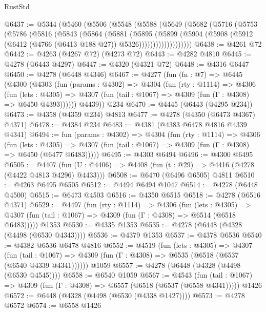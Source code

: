 \begin{lexlean}{RustStd}
\begin{coremodule}
@6437 := @5344
    (@5460
      (@5506
        (@5548
          (@5588
            (@5649
              (@5682
                (@5716
                  (@5753
                    (@5786
                      (@5816
                        (@5843
                          (@5864
                            (@5881
                              (@5895
                                (@5899
                                  (@5904
                                    (@5908
                                      (@5912
                                        (@6412 (@4766 (@6413 @188 @27)) @5326)))))))))))))))))))
@6438 := @4261 @72
@6442 := @4263 (@4267 @72) (@4273 @72)
@6443 := @4282 @4810
@6445 := @4278 (@6443 @4297)
@6447 := @4320 (@4321 @72)
@6448 := @4316 @6447
@6450 := @4278 (@6448 @4346)
@6467 := @4277
    (fun (fn : @7) =>
    @6445
      (@4300
        (@4303
          (fun (params : @4302) =>
          @4304
            (fun (rty : @1114) =>
            @4306
              (fun (lets : @4305) =>
              @4307 (fun (tail : @1067) => @4309 (fun (Γ : @4308) => @6450 @4393))))))
        @4439))
    @234
@6470 := @4445 (@6443 (@4295 @234))
@6473 := @4358 (@4359 @234) @4813
@6477 := @4278 (@4350 (@6473 @4367) @4371)
@6478 := @4384 @234
@6483 := @4381 (@4383 @6478 @4816 @4339 @4341)
@6494 := fun (params : @4302) =>
  @4304
    (fun (rty : @1114) =>
    @4306
      (fun (lets : @4305) =>
      @4307 (fun (tail : @1067) => @4309 (fun (Γ : @4308) => @6450 (@6477 @6483)))))
@6495 := @4303 @6494
@6496 := @4300 @6495
@6505 := @4407 (fun (U : @4406) => @4408 (fun (t : @29) => @4416 (@4278 (@4422 @4813 @4296) @4433)))
@6508 := @6470 (@6496 @6505) @4811
@6510 := @4263 @6495 @6505
@6512 := @4494 @6494 @1047
@6514 := @4278 (@6448 @4500)
@6515 := @6473 @4503
@6516 := @4350 @6515
@6518 := @4278 (@6516 @4371)
@6529 := @4497
    (fun (rty : @1114) =>
    @4306
      (fun (lets : @4305) =>
      @4307 (fun (tail : @1067) => @4309 (fun (Γ : @4308) => @6514 (@6518 @6483)))))
    @1353
@6530 := @4335 @1353
@6535 := @4278 (@6448 (@4328 (@4498 (@6530 @4343))))
@6536 := @4379 @1353
@6537 := @4378 @6536
@6540 := @4382 @6536 @6478 @4816
@6552 := @4519
    (fun (lets : @4305) =>
    @4307
      (fun (tail : @1067) => @4309 (fun (Γ : @4308) => @6535 (@6518 (@6537 (@6540 @4339 @4341))))))
    @1059
@6557 := @4278 (@6448 (@4328 (@4498 (@6530 @4545))))
@6558 := @6540 @1059
@6567 := @4543
    (fun (tail : @1067) => @4309 (fun (Γ : @4308) => @6557 (@6518 (@6537 (@6558 @4341)))))
    @1426
@6572 := @6448 (@4328 (@4498 (@6530 (@4338 @1427))))
@6573 := @4278 @6572
@6574 := @6558 @1426

\end{coremodule}
\end{lexlean}
